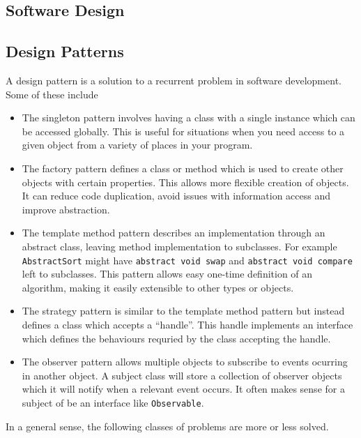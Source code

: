 \documentclass[12pt]{report}
\newcommand{\code}[1]{\lstinline{#1}}
\begin{document}
\begin{flushleft}
\section*{Software Design}

\subsection*{Design Patterns}

A design pattern is a solution to a recurrent problem in software development.
Some of these include

\begin{itemize}
    \item The singleton pattern involves having a class with a single instance
        which can be accessed globally. This is useful for situations when you
        need access to a given object from a variety of places in your program.
    \item The factory pattern defines a class or method which is used to create
        other objects with certain properties. This allows more flexible
        creation of objects. It can reduce code duplication, avoid issues with
        information access and improve abstraction.
    \item The template method pattern describes an implementation through an
        abstract class, leaving method implementation to subclasses. For
        example \code{AbstractSort} might have \code{abstract void swap} and
        \code{abstract void compare} left to subclasses. This pattern allows
        easy one-time definition of an algorithm, making it easily extensible
        to other types or objects.
    \item The strategy pattern is similar to the template method pattern but
        instead defines a class which accepts a ``handle''.  This handle
        implements an interface which defines the behaviours requried by the
        class accepting the handle.
    \item The observer pattern allows multiple objects to subscribe to events
        ocurring in another object. A subject class will store a collection of
        observer objects which it will notify when a relevant event occurs. It
        often makes sense for a subject of be an interface like
        \code{Observable}.
\end{itemize}

In a general sense, the following classes of problems are more or less solved.


\end{flushleft}
\end{document}
